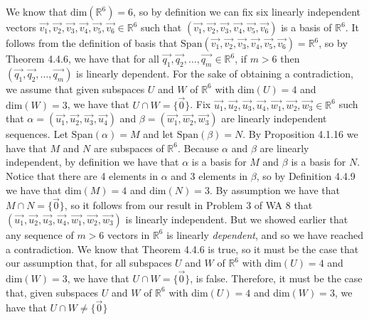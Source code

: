 \documentclass[12pt]{article}
\newenvironment{problem}[2][Problem]
{
	\begin{trivlist} 
		\item[\hskip \labelsep {\bfseries #1 #2:}]
	}
{
	\end{trivlist}
	}
\newenvironment{solution}[1][Solution]
{
	\begin{trivlist} 
		\item[\hskip \labelsep {\itshape #1:}]
	}
	{
	\end{trivlist}
}
\begin{document}
\begin{problem}{1}
\begin{solution}
We know that $\text{dim}(\mathbb{R}^6)=6$, so by definition we can fix six linearly independent vectors $\vec{v_1},\vec{v_2},\vec{v_3},\vec{v_4},\vec{v_5},\vec{v_6} \in \mathbb{R}^6$ such that $(\vec{v_1},\vec{v_2},\vec{v_3},\vec{v_4},\vec{v_5},\vec{v_6})$ is a basis of $\mathbb{R}^6$. It follows from the definition of basis that $\text{Span}(\vec{v_1},\vec{v_2},\vec{v_3},\vec{v_4},\vec{v_5},\vec{v_6})= \mathbb{R}^6$, so by Theorem 4.4.6, we have that for all $\vec{q_1},\vec{q_2}, \dots ,\vec{q_m}\in \mathbb{R}^6$, if $m > 6$ then $(\vec{q_1},\vec{q_2}, \dots, \vec{q_m})$ is linearly dependent. For the sake of obtaining a contradiction, we assume that given subspaces $U$ and $W$ of $\mathbb{R}^6$ with $\text{dim}(U)=4$ and $\text{dim}(W)=3$, we have that $U \cap W =\{\vec{0}\}$. Fix $\vec{u_1},\vec{u_2},\vec{u_3},\vec{u_4}, \vec{w_1},\vec{w_2},\vec{w_3} \in \mathbb{R}^6$ such that $\alpha=(\vec{u_1},\vec{u_2},\vec{u_3},\vec{u_4})$ and $\beta=(\vec{w_1},\vec{w_2},\vec{w_3})$ are linearly independent sequences. Let $\text{Span}(\alpha) = M$ and let $\text{Span}(\beta) =N$. By Proposition 4.1.16 we have that $M$ and $N$ are subspaces of $\mathbb{R}^6$. Because $\alpha$ and $\beta$ are linearly independent, by definition we have that $\alpha$ is a basis for $M$ and $\beta$ is a basis for $N$. Notice that there are 4 elements in $\alpha$ and 3 elements in $\beta$, so by Definition 4.4.9 we have that $\text{dim}(M) =4$ and  $\text{dim}(N)=3$.  By assumption we have that $M \cap N =\{\vec{0}\}$, so it follows from our result in Problem 3 of WA 8 that $(\vec{u_1},\vec{u_2},\vec{u_3},\vec{u_4}, \vec{w_1},\vec{w_2},\vec{w_3})$ is linearly independent. But we showed earlier that any sequence of $m>6$ vectors in $\mathbb{R}^6$ is linearly {\it dependent}, and so we have reached a contradiction. We know that Theorem 4.4.6 is true, so it must be the case that our assumption that, for all subspaces $U$ and $W$ of $\mathbb{R}^6$ with $\text{dim}(U)=4$ and $\text{dim}(W)=3$, we have that $U \cap W =\{\vec{0}\}$, is false. Therefore, it must be the case that,  given subspaces $U$ and $W$ of $\mathbb{R}^6$ with dim$(U)=4$ and dim$(W)=3$, we have that $U\cap W \neq \{ \vec{0} \}$
\end{solution}
\end{problem}
\end{document}
